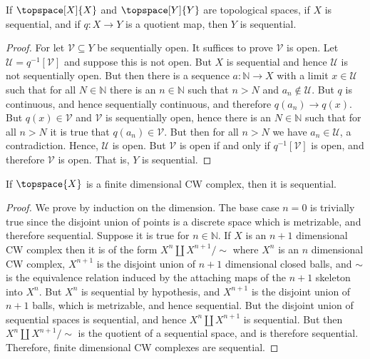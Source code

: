 \documentclass{article}                                                        %
\begin{document}
    \begin{theorem}
        If $\topspace[X]{X}$ and $\topspace[Y]{Y}$ are topological spaces, if
        $X$ is sequential, and if $q:X\rightarrow{Y}$ is a quotient map, then
        $Y$ is sequential.
    \end{theorem}
    \begin{proof}
        For let $\mathcal{V}\subseteq{Y}$ be sequentially open. It suffices to
        prove $\mathcal{V}$ is open. Let
        $\mathcal{U}=q^{\minus{1}}[\mathcal{V}]$ and suppose this is not open.
        But $X$ is sequential and hence $\mathcal{U}$ is not sequentially open.
        But then there is a sequence $a:\mathbb{N}\rightarrow{X}$ with a limit
        $x\in\mathcal{U}$ such that for all $N\in\mathbb{N}$ there is an
        $n\in\mathbb{N}$ such that $n>N$ and $a_{n}\notin\mathcal{U}$. But $q$
        is continuous, and hence sequentially continuous, and therefore
        $q(a_{n})\rightarrow{q}(x)$. But $q(x)\in\mathcal{V}$ and $\mathcal{V}$
        is sequentially open, hence there is an $N\in\mathbb{N}$ such that
        for all $n>N$ it is true that $q(a_{n})\in\mathcal{V}$. But then for
        all $n>N$ we have $a_{n}\in\mathcal{U}$, a contradiction. Hence,
        $\mathcal{U}$ is open. But $\mathcal{V}$ is open if and only if
        $q^{\minus{1}}[\mathcal{V}]$ is open, and therefore $\mathcal{V}$ is
        open. That is, $Y$ is sequential.
    \end{proof}
    \begin{theorem}
        If $\topspace{X}$ is a finite dimensional CW complex, then it is
        sequential.
    \end{theorem}
    \begin{proof}
        We prove by induction on the dimension. The base case $n=0$ is trivially
        true since the disjoint union of points is a discrete space which is
        metrizable, and therefore sequential. Suppose it is true for
        $n\in\mathbb{N}$. If $X$ is an $n+1$ dimensional CW complex then it is
        of the form $X^{n}\coprod{X}^{n+1}/\sim$ where $X^{n}$ is an $n$
        dimensional CW complex, $X^{n+1}$ is the disjoint union of $n+1$
        dimensional closed balls, and $\sim$ is the equivalence relation induced
        by the attaching maps of the $n+1$ skeleton into $X^{n}$. But $X^{n}$ is
        sequential by hypothesis, and $X^{n+1}$ is
        the disjoint union of $n+1$ balls, which is metrizable, and hence
        sequential. But the disjoint union of sequential spaces is sequential,
        and hence $X^{n}\coprod{X}^{n+1}$ is sequential. But then
        $X^{n}\coprod{X}^{n+1}/\sim$ is the quotient of a sequential space, and
        is therefore sequential. Therefore, finite dimensional CW complexes are
        sequential.
    \end{proof}
\end{document}
